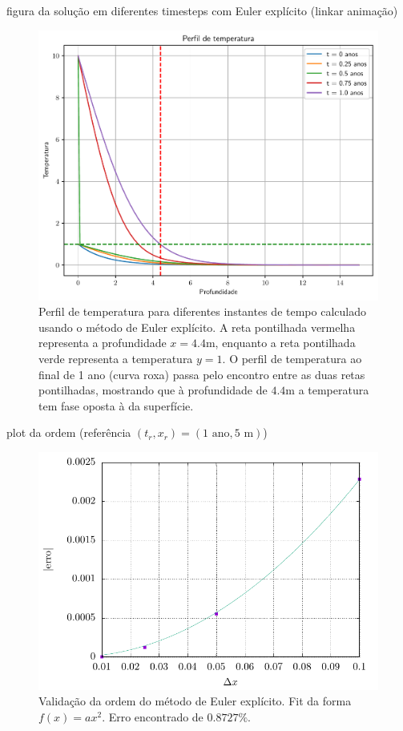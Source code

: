 \documentclass[twocolumn,showpacs,%
  nofootinbib,aps,superscriptaddress,%
  eqsecnum,prd,notitlepage,showkeys,10pt]{revtex4-1} %
\begin{document}
	figura da solução em diferentes timesteps com Euler explícito (linkar animação)
	\begin{figure}[t]%
		\label{fig:exp-euler}
		\includegraphics[width=.5\textwidth]{Codes/exp-euler.pdf}
		\caption{Perfil de temperatura para diferentes instantes de tempo calculado usando
		o método de Euler explícito. A reta pontilhada
		vermelha representa a profundidade $x = 4.4$m, enquanto a reta pontilhada verde
		representa a temperatura $y=1$. O perfil de temperatura ao final de 1 ano (curva roxa)
		passa pelo encontro entre as duas retas pontilhadas, mostrando que à profundidade
		de $4.4$m a temperatura tem fase oposta à da superfície.}
	\end{figure}

	plot da ordem (referência $(t_r, x_r) = (1 \text{ ano}, 5 \text{ m})$)
	\begin{figure}[b]%
		\label{fig:ordem-exp-euler}
		\includegraphics[width=.5\textwidth]{Codes/ordem-exp-euler.pdf}
		\caption{Validação da ordem do método de Euler explícito. Fit da forma $f(x) = ax^2$. Erro encontrado de $0.8727\%$.}
	\end{figure}
\end{document}
